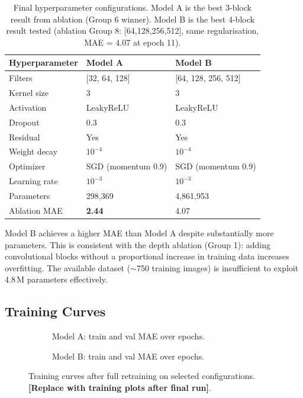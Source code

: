 \documentclass[11pt,a4paper]{article}
\begin{document}
\begin{table}[h]
\centering
\caption{Final hyperparameter configurations. Model A is the best 3-block result from
ablation (Group 6 winner). Model B is the best 4-block result tested (ablation Group 8:
[64,128,256,512], same regularisation, MAE = 4.07 at epoch 11).}
\begin{tabular}{lll}
\toprule
Hyperparameter & Model A & Model B \\
\midrule
Filters        & {[}32, 64, 128{]}      & {[}64, 128, 256, 512{]} \\
Kernel size    & 3                      & 3 \\
Activation     & LeakyReLU              & LeakyReLU \\
Dropout        & 0.3                    & 0.3 \\
Residual       & Yes                    & Yes \\
Weight decay   & $10^{-4}$              & $10^{-4}$ \\
Optimizer      & SGD (momentum 0.9)     & SGD (momentum 0.9) \\
Learning rate  & $10^{-3}$              & $10^{-3}$ \\
Parameters     & 298,369                & 4,861,953 \\
Ablation MAE   & \textbf{2.44}          & 4.07 \\
\bottomrule
\end{tabular}
\label{tab:configs}
\end{table}

Model B achieves a higher MAE than Model A despite substantially more parameters.
This is consistent with the depth ablation (Group 1): adding convolutional blocks without
a proportional increase in training data increases overfitting. The available dataset
($\sim$750 training images) is insufficient to exploit 4.8\,M parameters effectively.

\subsection{Training Curves}
\label{sec:results_task1}

\begin{figure}[h]
\centering
\begin{subfigure}[b]{0.48\textwidth}
\fbox{\rule{0pt}{4cm}\rule{\textwidth}{0pt}}
\caption{Model A: train and val MAE over epochs.}
\end{subfigure}
\hfill
\begin{subfigure}[b]{0.48\textwidth}
\fbox{\rule{0pt}{4cm}\rule{\textwidth}{0pt}}
\caption{Model B: train and val MAE over epochs.}
\end{subfigure}
\caption{Training curves after full retraining on selected configurations.
\textbf{[Replace with training plots after final run]}.}
\label{fig:training_curves}
\end{figure}
\end{document}

